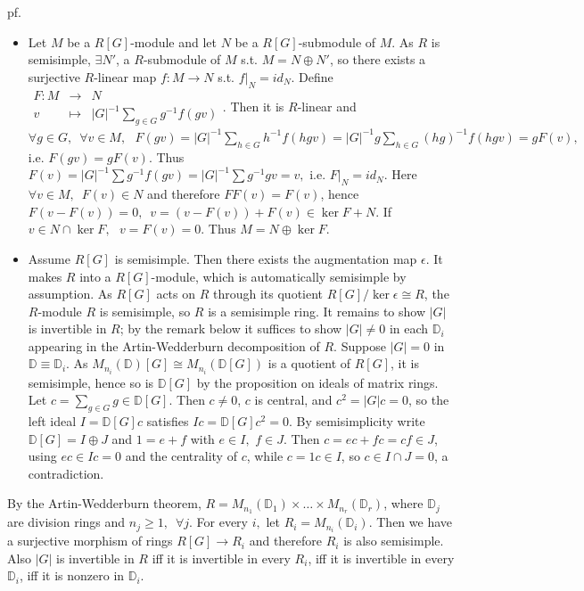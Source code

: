 \documentclass[12pt,letterpaper]{report}
\begin{document}
pf. \begin{itemize}\item Let $M$ be a $R[G]$-module and let $N$ be a $R[G]$-submodule of $M$. As $R$ is semisimple, $\exists N'$, a $R$-submodule of $M$ s.t. $M=N\oplus N'$, so there exists a surjective $R$-linear map $f:M\rightarrow N$ s.t. $f|_{N}=id_{N}$. Define $\begin{array}{rrr}F:M&\rightarrow&N\\v&\mapsto&|G|^{-1}\sum_{g\in G}g^{-1}f(gv)\end{array}$. Then it is $R$-linear and $\forall g\in G,\,\,\,\forall v\in M,\,\,\,\,F(gv)=|G|^{-1}\sum_{h\in G}h^{-1}f(hgv)=|G|^{-1}g\sum_{h\in G}(hg)^{-1}f(hgv)=gF(v),$ i.e. $F(gv)=gF(v)$. Thus $F(v)=|G|^{-1}\sum g^{-1}f(gv)=|G|^{-1}\sum g^{-1}gv=v,$ i.e. $F|_{N}=id_{N}$. Here $\forall v\in M,\,\,\,F(v)\in N$ and therefore $FF(v)=F(v)$, hence $F(v-F(v))=0,\,\,\,v=(v-F(v))+F(v)\in \ker F+N$. If $v\in N\cap\ker F,\,\,\,\,v=F(v)=0$. Thus $M=N\oplus \ker F$.
\item Assume $R[G]$ is semisimple. Then there exists the augmentation map $\epsilon$. It makes $R$ into a $R[G]$-module, which is automatically semisimple by assumption. As $R[G]$ acts on $R$ through its quotient $R[G]/\ker\epsilon\cong R$, the $R$-module $R$ is semisimple, so $R$ is a semisimple ring. It remains to show $|G|$ is invertible in $R$; by the remark below it suffices to show $|G|\neq0$ in each $\mathbb{D}_{i}$ appearing in the Artin-Wedderburn decomposition of $R$. Suppose $|G|=0$ in $\mathbb{D}\equiv\mathbb{D}_{i}$. As $M_{n_{i}}(\mathbb{D})[G]\cong M_{n_{i}}(\mathbb{D}[G])$ is a quotient of $R[G]$, it is semisimple, hence so is $\mathbb{D}[G]$ by the proposition on ideals of matrix rings. Let $c=\sum_{g\in G}g\in\mathbb{D}[G]$. Then $c\neq0$, $c$ is central, and $c^{2}=|G|c=0$, so the left ideal $I=\mathbb{D}[G]c$ satisfies $Ic=\mathbb{D}[G]c^{2}=0$. By semisimplicity write $\mathbb{D}[G]=I\oplus J$ and $1=e+f$ with $e\in I,\,\,f\in J$. Then $c=ec+fc=cf\in J$, using $ec\in Ic=0$ and the centrality of $c$, while $c=1c\in I$, so $c\in I\cap J=0$, a contradiction.


\end{itemize}
By the Artin-Wedderburn theorem, $R=M_{n_{1}}(\mathbb{D}_{1})\times\dots\times M_{n_{r}}(\mathbb{D}_{r})$, where $\mathbb{D}_{j}$ are division rings and $n_{j}\geq1,\,\,\,\forall j$. For every $i,$ let $R_{i}=M_{n_{i}}(\mathbb{D}_{i})$. Then we have a surjective morphism of rings $R[G]\rightarrow R_{i}$ and therefore $R_{i}$ is also semisimple. Also $|G|$ is invertible in $R$ iff it is invertible in every  $R_{i}$, iff it is invertible in every $\mathbb{D}_{i}$, iff it is nonzero in $\mathbb{D}_{i}$.
\end{document}
